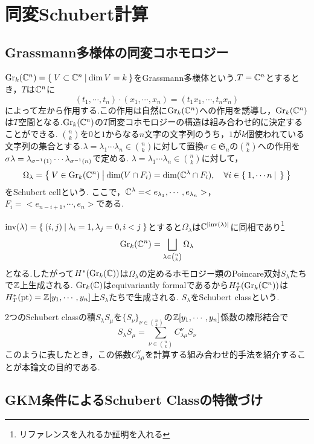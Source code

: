 \section{同変Schubert計算}
\subsection{Grassmann多様体の同変コホモロジー}
$\text{Gr}_k(\mathbb{C}^n)=\left\{\:V\subset \mathbb{C}^n\:\middle|\:\dim V = k\:\right\}$をGrassmann多様体という.$T=\mathbb{C}^n$とするとき，$T$は$\mathbb{C}^n$に
\[
(t_1,\cdots,t_n)\cdot(x_1,\cdots,x_n)=(t_1x_1,\cdots,t_nx_n)
\]
によって左から作用する.この作用は自然に$\text{Gr}_k(\mathbb{C}^n)$への作用を誘導し，$\text{Gr}_k(\mathbb{C}^n)$は$T$空間となる.$\text{Gr}_k(\mathbb{C}^n)$の$T$同変コホモロジーの構造は組み合わせ的に決定することができる.
$\binom{n}{k}$を$0$と$1$からなる$n$文字の文字列のうち，$1$が$k$個使われている文字列の集合とする.$\lambda=\lambda_1\cdots \lambda_n\in\binom{n}{k}$に対して置換$\sigma\in\mathfrak{S}_n$の$\binom{n}{k}$への作用を$\sigma\lambda=\lambda_{\sigma^{-1}(1)}\cdots\lambda_{\sigma^{-1}(n)}$で定める.
$\lambda=\lambda_1\cdots \lambda_n\in\binom{n}{k}$に対して，
\[
\Omega_\lambda=\left\{\:V\in \text{Gr}_k(\mathbb{C}^n)\:\middle|\:\dim(V\cap F_i)= \dim(\mathbb{C}^\lambda\cap F_i),\quad \forall i\in \left\{\:1,\cdots n\:\middle|\:\:\right\}\:\right\}
\]
をSchubert cellという. ここで，$\mathbb{C}^\lambda=<e_{\lambda_1},\cdots,e_{\lambda_n}>$， $F_i=<e_{n-i+1},\cdots,e_n>$である. 

$\text{inv}(\lambda)=\left\{\:(i,j)\:\middle|\:\lambda_i=1, \lambda_j=0, i<j\:\right\}$とすると$\Omega_\lambda$は$\mathbb{C}^{|\text{inv}(\lambda)|}$に同相であり\footnote{リファレンスを入れるか証明を入れる}
\[
\text{Gr}_k(\mathbb{C}^n)=\bigsqcup_{\lambda\in\binom{n}{k}}\Omega_\lambda
\]
となる.したがって$H^*(\text{Gr}_k(\mathbb{C}))$は$\Omega_\lambda$の定めるホモロジー類のPoincare双対$S_\lambda$たちで$\mathbb{Z}$上生成される. $\text{Gr}_k(\mathbb{C})$はequivariantly formalであるから$H^*_T(\text{Gr}_k(\mathbb{C}^n))$は$H^*_T(\text{pt})=\mathbb{Z}[y_1,\cdots,y_n]$上$S_\lambda$たちで生成される. $S_\lambda$をSchubert classという.

$2$つのSchubert classの積$S_\lambda S_\mu$を$\{S_\nu\}_{\nu\in\binom{n}{k}}$の$\mathbb{Z}[y_1,\cdots,y_n]$係数の線形結合で
\[
S_\lambda S_\mu=\sum_{\nu\in\binom{n}{k}}C^\nu_{\lambda\mu}S_\nu
\]
このように表したとき，この係数$C^{\nu}_{\lambda\mu}$を計算する組み合わせ的手法を紹介することが本論文の目的である.


\subsection{GKM条件によるSchubert Classの特徴づけ}

